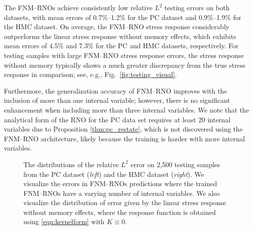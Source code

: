 \documentclass[letterpaper,11pt]{article}
\begin{document}
The FNM--RNOs achieve consistently low relative $L^2$ testing errors on both datasets, with mean errors of 0.7\%--1.2\% for the PC dataset and 0.9\%--1.9\% for the HMC dataset. On average, the FNM--RNO stress response considerably outperforms the linear stress response without memory effects, which exhibits mean errors of 4.5\% and 7.3\% for the PC and HMC datasets, respectively. For testing samples with large FNM--RNO stress response errors, the stress response without memory typically shows a much greater discrepancy from the true stress response in comparison; see, e.g., Fig.~\ref{fig:testing_visual}.

Furthermore, the generalization accuracy of FNM--RNO improves with the inclusion of more than one internal variable; however, there is no significant enhancement when including more than three internal variables. We note that the analytical form of the RNO for the PC data set requires at least 20 internal variables due to Proposition \ref{thm:pc_restate}, which is not discovered using the FNM--RNO architecture, likely because the training is harder with more internal variables.

\begin{figure}[htb]
    \centering
    \caption{The distributions of the relative $L^2$ error on 2,500 testing samples from the PC dataset (\textit{left}) and the HMC dataset (\textit{right}). We visualize the errors in FNM--RNOs predictions where the trained FNM--RNOs have a varying number of internal variables. We also visualize the distribution of error given by the linear stress response without memory effects, where the response function is obtained using \eqref{eqn:kernelform} with $K\equiv0$.} 
    \label{fig:testing_error_distribution}
\end{figure}
\end{document}
